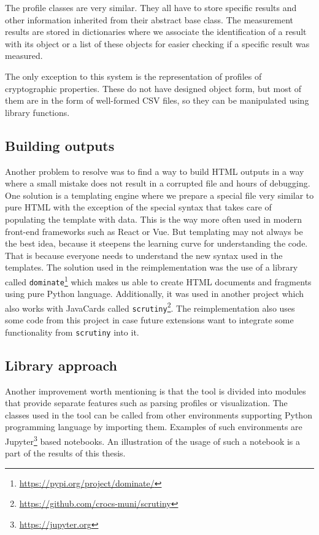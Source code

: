 The profile classes are very similar. They all have to store specific results and other information inherited from their abstract base class. The measurement results are stored in dictionaries where we associate the identification of a result with its object or a list of these objects for easier checking if a specific result was measured.

The only exception to this system is the representation of profiles of cryptographic properties. These do not have designed object form, but most of them are in the form of well-formed CSV files, so they can be manipulated using library functions.


\subsection{Building outputs}
Another problem to resolve was to find a way to build HTML outputs in a way where a small mistake does not result in a corrupted file and hours of debugging. One solution is a templating engine where we prepare a special file very similar to pure HTML with the exception of the special syntax that takes care of populating the template with data. This is the way more often used in modern front-end frameworks such as React or Vue. But templating may not always be the best idea, because it steepens the learning curve for understanding the code. That is because everyone needs to understand the new syntax used in the templates. The solution used in the reimplementation was the use of a library called \texttt{dominate}\footnote{\url{https://pypi.org/project/dominate/}} which makes us able to create HTML documents and fragments using pure Python language. Additionally, it was used in another project which also works with JavaCards called \texttt{scrutiny}\footnote{\url{https://github.com/crocs-muni/scrutiny}}. The reimplementation also uses some code from this project in case future extensions want to integrate some functionality from \texttt{scrutiny} into it.

\subsection{Library approach}
Another improvement worth mentioning is that the tool is divided into modules that provide separate  features such as parsing profiles or visualization. The classes used in the tool can be called from other environments supporting Python programming language by importing them. Examples of such environments are Jupyter\footnote{\url{https://jupyter.org}} based notebooks. An illustration of the usage of such a notebook is a part of the results of this thesis.
